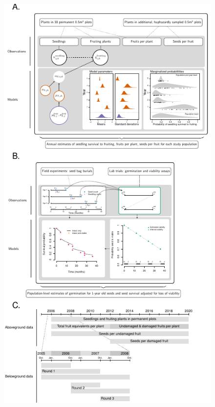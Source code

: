 \documentclass[12pt, oneside, titlepage]{article}   	%
\begin{document}
 \begin{figure}[!h]
\centering
       \includegraphics[scale=1]{../manuscript/figures-overview/diagram-figure.pdf}  

\end{figure}
\end{document}
